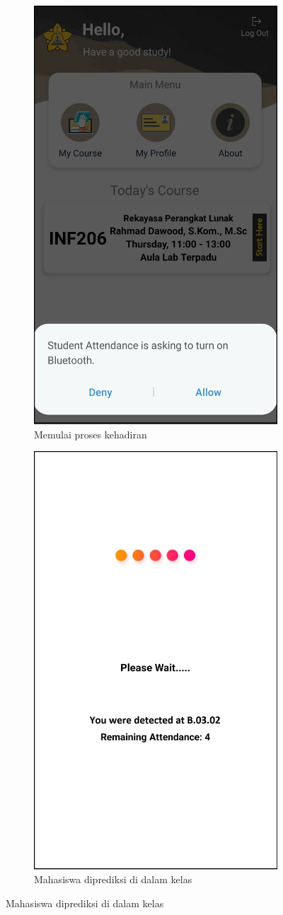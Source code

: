 \begin{enumerate}[a.]
\begin{figure} [H]
\begin{subfigure}{.5\textwidth}
  		\includegraphics[width=.5\linewidth]{gambar/android/mahasiswa-6}  
  		\caption{Memulai proses kehadiran}
	\end{subfigure}
	\vspace{1cm}
	\newline
	\begin{subfigure}{.5\textwidth}
  		\centering
  		\includegraphics[width=.5\linewidth]{gambar/android/mahasiswa-7}  
  		\caption{Mahasiswa diprediksi di dalam kelas}

\end{subfigure}
\end{figure}
\end{enumerate}
